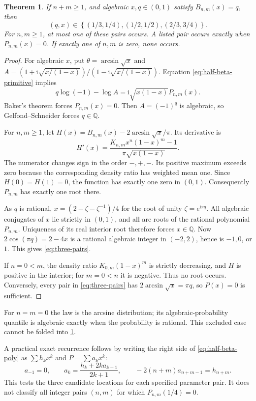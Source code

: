 \documentclass[11pt,a4paper]{article}
\numberwithin{equation}{section}
\newtheorem{theorem}{Theorem}[section]
\theoremstyle{definition}
\theoremstyle{remark}
\newcommand{\Q}{\mathbb Q}
\newcommand{\ii}{\mathrm i}
\begin{document}
\begin{theorem}\label{thm:three-pairs}
If $n+m\ge1$, and algebraic $x,q\in(0,1)$ satisfy $B_{n,m}(x)=q$, then
\begin{equation}\label{eq:three-pairs}
 (q,x)\in\left\{(1/3,1/4),(1/2,1/2),(2/3,3/4)\right\}.
\end{equation}
For $n,m\ge1$, at most one of these pairs occurs. A listed pair occurs
exactly when $P_{n,m}(x)=0$. If exactly one of $n,m$ is zero, none occurs.
\end{theorem}
\begin{proof}
For algebraic $x$, put $\theta=\arcsin\sqrt x$ and
$A=(1+\ii\sqrt{x/(1-x)})/(1-\ii\sqrt{x/(1-x)})$.
Equation \eqref{eq:half-beta-primitive} implies
\[
 q\log(-1)-\log A=\ii\sqrt{x(1-x)}P_{n,m}(x).
\]
Baker's theorem forces $P_{n,m}(x)=0$. Then $A=(-1)^q$ is algebraic, so
Gelfond--Schneider forces $q\in\Q$.

For $n,m\ge1$, let
$H(x)=B_{n,m}(x)-2\arcsin\sqrt x/\pi$. Its derivative is
\[
 H'(x)=\frac{K_{n,m}x^n(1-x)^m-1}{\pi\sqrt{x(1-x)}}.
\]
The numerator changes sign in the order $-,+,-$. Its positive maximum
exceeds zero because the corresponding density ratio has weighted mean one.
Since $H(0)=H(1)=0$, the function has exactly one zero in $(0,1)$.
Consequently $P_{n,m}$ has exactly one root there.

As $q$ is rational,
$x=(2-\zeta-\zeta^{-1})/4$ for the root of unity $\zeta=e^{\ii\pi q}$.
All algebraic conjugates of $x$ lie strictly in $(0,1)$, and all are roots
of the rational polynomial $P_{n,m}$. Uniqueness of its real interior root
therefore forces $x\in\Q$. Now
$2\cos(\pi q)=2-4x$ is a rational algebraic integer in $(-2,2)$, hence is
$-1,0$, or $1$. This gives \eqref{eq:three-pairs}.

If $n=0<m$, the density ratio $K_{0,m}(1-x)^m$ is strictly decreasing, and
$H$ is positive in the interior; for $m=0<n$ it is negative. Thus no root
occurs. Conversely, every pair in \eqref{eq:three-pairs} has
$2\arcsin\sqrt x=\pi q$, so $P(x)=0$ is sufficient.
\end{proof}
For $n=m=0$ the law is the arcsine distribution; its algebraic-probability
quantile is algebraic exactly when the probability is rational. This
excluded case cannot be folded into \cref{thm:three-pairs}.

A practical exact recurrence follows by writing the right side of
\eqref{eq:half-beta-poly} as $\sum h_kx^k$ and $P=\sum a_kx^k$:
\[
 a_{-1}=0,\qquad a_k=\frac{h_k+2ka_{k-1}}{2k+1},
 \qquad -2(n+m)a_{n+m-1}=h_{n+m}.
\]
This tests the three candidate locations for each specified parameter pair.
It does not classify all integer pairs $(n,m)$ for which $P_{n,m}(1/4)=0$.
\end{document}
